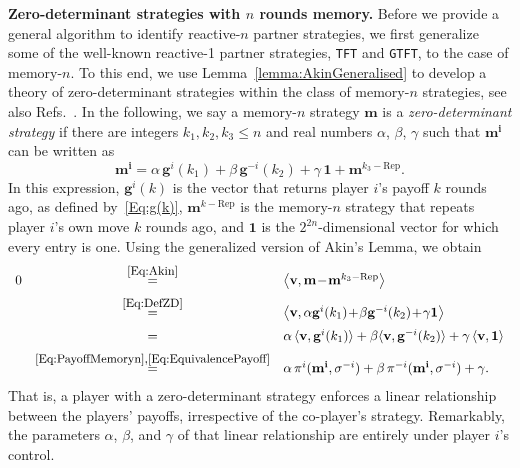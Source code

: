 \documentclass[9pt,twoside,lineno]{pnas-new}
\theoremstyle{plainCl1}
\theoremstyle{plainCl2}
\def\tft{\texttt{TFT}}
\def\gtft{\texttt{GTFT}}
\begin{document}
{\bf Zero-determinant strategies with $n$ rounds memory.}
Before we provide a general algorithm to identify reactive-$n$ partner strategies, we first generalize some of the well-known reactive-1 partner strategies, \tft{} and \gtft{}, to the case of memory-$n$. 
To this end, we use Lemma~\ref{lemma:AkinGeneralised} to develop a theory of zero-determinant strategies within the class of memory-$n$ strategies, see also Refs.~\citep{stewart:scientific:2016,ueda:RSOP:2021}.
In the following, we say a memory-$n$ strategy $\mathbf{m}$ is a {\it zero-determinant
strategy} if there are integers $k_1, k_2, k_3\!\le\!n$ and real numbers $\alpha$, $\beta$, $\gamma$ such
that $\mathbf{m^{i}}$ can be written as
\begin{equation} \label{Eq:DefZD}
\mathbf{m^{i}} = \alpha\, \mathbf{g}^i(k_1) + \beta\, \mathbf{g}^{-i}(k_2) + \gamma\, \mathbf{1} + \mathbf{m}^{k_3-\text{Rep}}. 
\end{equation}
In this expression, $\mathbf{g}^i(k)$ is the vector that returns player $i$'s payoff $k$ rounds ago, as defined by~\eqref{Eq:g(k)}, $\mathbf{m}^{k-\text{Rep}}$ is the memory-$n$ strategy that repeats player $i$'s own move $k$ rounds ago, and $\mathbf{1}$ is the $2^{2n}$-dimensional vector for which every entry is one. Using the generalized version of Akin's Lemma, we obtain
\begin{equation} \label{Eq:PayoffZD}
\begin{array}{lcl}
0 
&\stackrel{\mbox{\small \eqref{Eq:Akin}}}{=}  
&\big\langle \mathbf{v} , \mathbf{m}\!-\!\mathbf{m}^{k_3-\text{Rep}}\big\rangle\\[0.2cm]
&\stackrel{\mbox{\small \eqref{Eq:DefZD}}}{=} 
&\big\langle \mathbf{v} ,\alpha \mathbf{g}^i(k_1) \!+\! \beta \mathbf{g}^{-i}(k_2) \!+\! \gamma \mathbf{1} \big\rangle\\[0.2cm]
&= 
&\alpha \, \langle \mathbf{v},\mathbf{g}^i(k_1)\rangle + \beta \langle \mathbf{v},\mathbf{g}^{-i}(k_2) \rangle+\gamma\,\langle\mathbf{v},\mathbf{1}\rangle\\[0.2cm]
&\stackrel{\mbox{\small \eqref{Eq:PayoffMemoryn},\eqref{Eq:EquivalencePayoff}}}{=} 
&\alpha \, \pi^i(\mathbf{m^i},\sigma^{-i}) + \beta \, \pi^{-i}(\mathbf{m^i},\sigma^{-i}) + \gamma.
\end{array}
\end{equation}
That is, a player with a zero-determinant strategy enforces a linear relationship between the players' payoffs, irrespective of the co-player's strategy. 
Remarkably, the parameters $\alpha$, $\beta$, and $\gamma$ of that linear relationship are entirely under player $i$'s control.\\
\end{document}
